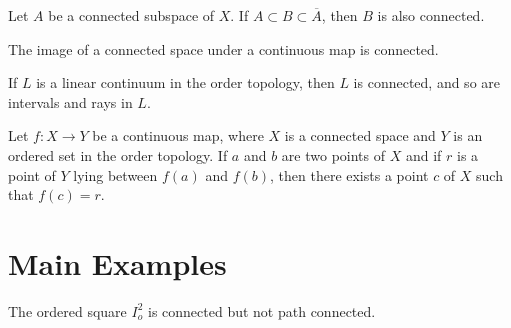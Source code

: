 \documentclass[11pt]{article}
\begin{document}
\begin{theorem*}[23.4, page 150]
Let $A$ be a connected subspace of $X$. If $A \subset B \subset \overline{A}$, then $B$ is also connected.
\end{theorem*}

\begin{theorem*}[23.5, page 150]
The image of a connected space under a continuous map is connected.
\end{theorem*}

\begin{theorem*}[24.1, page 153]
If $L$ is a linear continuum in the order topology, then $L$ is connected, and so are intervals and rays in $L$.
\end{theorem*}

\begin{theorem*}
Let $f \colon X \rightarrow Y$ be a continuous map, where $X$ is a connected space and $Y$ is an ordered set in the order topology. If $a$ and $b$ are two points of $X$ and if $r$ is a point of $Y$ lying between $f(a)$ and $f(b)$, then there exists a point $c$ of $X$ such that $f(c) = r$.
\end{theorem*}

\newpage

\section{Main Examples}

\begin{eg}
The ordered square $I_o^2$ is connected but not path connected.
\end{eg}
\end{document}
